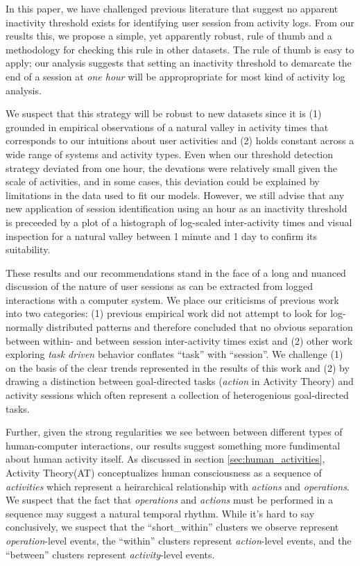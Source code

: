 In this paper, we have challenged previous literature that suggest no apparent inactivity threshold exists for identifying user session from activity logs.  From our reuslts this, we propose a simple, yet apparently robust, rule of thumb and a methodology for checking this rule in other datasets.  The rule of thumb is easy to apply; our analysis suggests that setting an inactivity threshold to demarcate the end of a session at \emph{one hour} will be appropropriate for most kind of activity log analysis.

We suspect that this strategy will be robust to new datasets since it is (1) grounded in empirical observations of a natural valley in activity times that corresponds to our intuitions about user activities and (2) holds constant across a wide range of systems and activity types. Even when our threshold detection strategy deviated from one hour, the devations were relatively small given the scale of activities, and in some cases, this deviation could be explained by limitations in the data used to fit our models.  However, we still advise that any new application of session identification using an hour as an inactivity threshold is preceeded by a plot of a histograph of log-scaled inter-activity times and visual inspection for a natural valley between 1 minute and 1 day to confirm its suitability.

These results and our recommendations stand in the face of a long and nuanced discussion of the nature of user sessions as can be extracted from logged interactions with a computer system.  We place our criticisms of previous work into two categories: (1) previous empirical work did not attempt to look for log-normally distributed patterns and therefore concluded that no obvious separation between within- and between session inter-activity times exist\cite{something} and (2) other work exploring \emph{task driven} behavior conflates ``task'' with ``session''.  We challenge (1) on the basis of the clear trends represented in the results of this work and (2) by drawing a distinction between goal-directed tasks (\emph{action} in Activity Theory) and activity sessions which often represent a collection of heterogenious goal-directed tasks.

Further, given the strong regularities we see between between different types of human-computer interactions, our results suggest something more fundimental about human activity itself.  As discussed in section \ref{sec:human_activities}, Activity Theory(AT) conceptualizes human consciousness as a sequence of \emph{activities} which represent a heirarchical relationship with \emph{actions} and \emph{operations}.  We suspect that the fact that \emph{operations} and \emph{actions} must be performed in a sequence may suggest a natural temporal rhythm.  While it's hard to say conclusively, we suspect that the ``short\_within'' clusters we observe represent \emph{operation}-level events, the ``within'' clusters represent \emph{action}-level events, and the ``between'' clusters represent \emph{activity}-level events.

